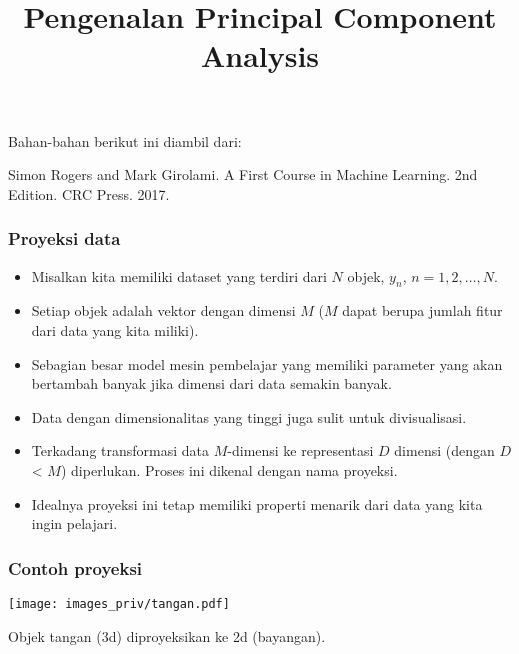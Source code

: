 \documentclass[bahasa,11pt,aspectratio=169]{beamer}
\begin{document}
\title{Pengenalan Principal Component Analysis}
\date{} %

\frame{\titlepage}


\begin{frame}

Bahan-bahan berikut ini diambil dari:

Simon Rogers and Mark Girolami. A First Course in Machine Learning. 2nd Edition.
CRC Press. 2017.

\end{frame}

\begin{frame}
\frametitle{Proyeksi data}

\begin{itemize}
\item Misalkan kita memiliki dataset yang terdiri dari $N$ objek, $y_{n}$, $n=1,2,\ldots,N$.
%
\item Setiap objek adalah vektor dengan dimensi $M$ ($M$ dapat berupa jumlah fitur dari
data yang kita miliki).
%
\item Sebagian besar model mesin pembelajar yang memiliki parameter yang akan
bertambah banyak jika dimensi dari data semakin banyak.
%
\item Data dengan dimensionalitas yang tinggi juga sulit untuk divisualisasi.
%
\item Terkadang transformasi data $M$-dimensi ke representasi $D$ dimensi (dengan $D$ < $M$)
diperlukan. Proses ini dikenal dengan nama proyeksi.
%
\item Idealnya proyeksi ini tetap memiliki properti menarik dari data yang kita
ingin pelajari.
\end{itemize}

\end{frame}




\begin{frame}[fragile]
\frametitle{Contoh proyeksi}

\begin{center}
\texttt{[image: images\_priv/tangan.pdf]}
\end{center}

Objek tangan (3d) diproyeksikan ke 2d (bayangan).

\end{frame}
\end{document}
